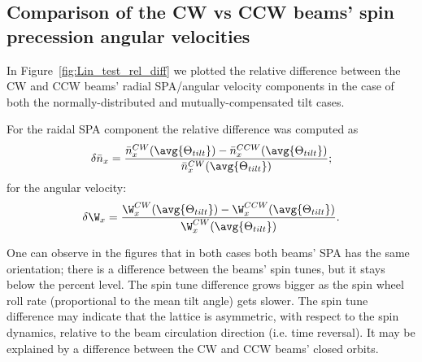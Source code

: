 \subsection{Comparison of the CW vs CCW beams' spin precession angular velocities}\label{chpt3:imperfections:CW_vs_CCW}
In Figure~\ref{fig:Lin_test_rel_diff} we plotted the relative difference between the CW and CCW beams' radial SPA/angular velocity
components in the case of both the normally-distributed and mutually-compensated tilt cases.

For the raidal SPA component the relative difference was computed as
\[
\delta\bar n_x = \frac{\bar n_x^{CW}(\avg{\Theta_{tilt}}) - \bar n_x^{CCW}(\avg{\Theta_{tilt}})}{\bar n_x^{CW}(\avg{\Theta_{tilt}})};
\]
for the angular velocity:
\[
\delta\W_x = \frac{\W_x^{CW}(\avg{\Theta_{tilt}}) - \W_x^{CCW}(\avg{\Theta_{tilt}})}{\W_x^{CW}(\avg{\Theta_{tilt}})}.
\]

One can observe in the figures that in both cases both beams' SPA has the same orientation; there is a difference
between the beams' spin tunes, but it stays below the percent level. The spin tune difference grows bigger as the
spin wheel roll rate (proportional to the mean tilt angle) gets slower. The spin tune difference may indicate that
the lattice is asymmetric, with respect to the spin dynamics, relative to the beam circulation direction (i.e. time reversal).
It may be explained by a difference between the CW and CCW beams' closed orbits.

